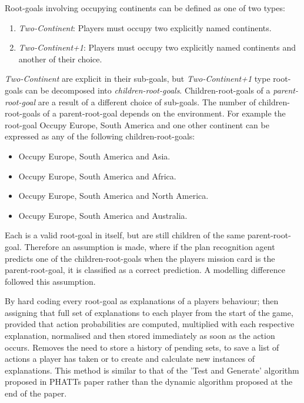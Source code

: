 \documentclass[parskip]{cs4rep}
\begin{document}
Root-goals involving occupying continents can be defined as one of two types:

\begin{enumerate}
\item
\textit{Two-Continent}: Players must occupy two explicitly named continents.
\item
\textit{Two-Continent+1}: Players must occupy two explicitly named continents and another of their choice.
\end{enumerate}

\textit{Two-Continent} are explicit in their sub-goals, but \textit{Two-Continent+1} type root-goals can be decomposed into \textit{children-root-goals}. Children-root-goals of a \textit{parent-root-goal} are a result of a different choice of sub-goals. The number of children-root-goals of a parent-root-goal depends on the environment. For example the root-goal Occupy Europe, South America and one other continent can be expressed as any of the following children-root-goals:

\begin{itemize}
\item
Occupy Europe, South America and Asia.
\item
Occupy Europe, South America and Africa.
\item
Occupy Europe, South America and North America.
\item
Occupy Europe, South America and Australia.\newline
\end{itemize}

Each is a valid root-goal in itself, but are still children of the same parent-root-goal. Therefore an assumption is made, where if the plan recognition agent predicts one of the children-root-goals when the players mission card is the parent-root-goal, it is classified as a correct prediction. A modelling difference followed this assumption.

By hard coding every root-goal as explanations of a players behaviour; then assigning that full set of explanations to each player from the start of the game, provided that action probabilities are computed, multiplied with each respective explanation, normalised and then stored immediately as soon as the action occurs. Removes the need to store a history of pending sets, to save a list of actions a player has taken or to create and calculate new instances of explanations. This method is similar to that of the 'Test and Generate' algorithm proposed in PHATTs paper rather than the dynamic algorithm proposed at the end of the paper.
\end{document}
